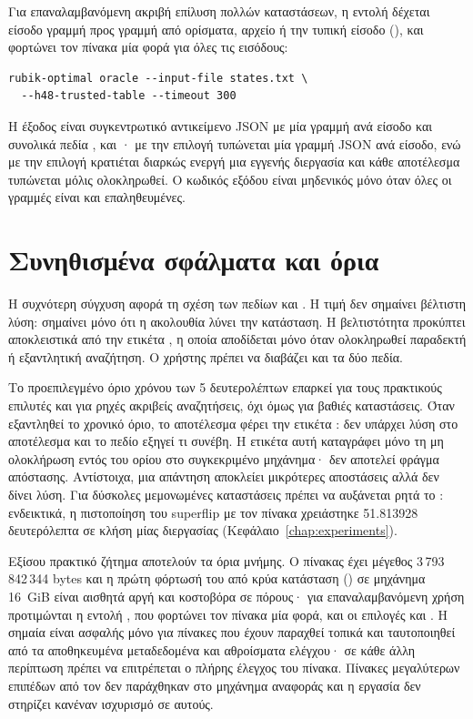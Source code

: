 Για επαναλαμβανόμενη ακριβή επίλυση πολλών καταστάσεων, η εντολή  δέχεται είσοδο γραμμή προς γραμμή από ορίσματα, αρχείο ή την τυπική είσοδο (), και φορτώνει τον πίνακα  μία φορά για όλες τις εισόδους:

\begin{verbatim}
rubik-optimal oracle --input-file states.txt \
  --h48-trusted-table --timeout 300
\end{verbatim}

Η έξοδος είναι συγκεντρωτικό αντικείμενο JSON με μία γραμμή ανά είσοδο και συνολικά πεδία ,  και · με την επιλογή  τυπώνεται μία γραμμή JSON ανά είσοδο, ενώ με την επιλογή  κρατιέται διαρκώς ενεργή μια εγγενής διεργασία και κάθε αποτέλεσμα τυπώνεται μόλις ολοκληρωθεί. Ο κωδικός εξόδου είναι μηδενικός μόνο όταν όλες οι γραμμές είναι  και επαληθευμένες.

\section{Συνηθισμένα σφάλματα και όρια}
\label{sec:usage-errors}

Η συχνότερη σύγχυση αφορά τη σχέση των πεδίων  και . Η τιμή  δεν σημαίνει βέλτιστη λύση: σημαίνει μόνο ότι η ακολουθία λύνει την κατάσταση. Η βελτιστότητα προκύπτει αποκλειστικά από την ετικέτα , η οποία αποδίδεται μόνο όταν ολοκληρωθεί παραδεκτή ή εξαντλητική αναζήτηση. Ο χρήστης πρέπει να διαβάζει και τα δύο πεδία.

Το προεπιλεγμένο όριο χρόνου των 5 δευτερολέπτων επαρκεί για τους πρακτικούς επιλυτές και για ρηχές ακριβείς αναζητήσεις, όχι όμως για βαθιές καταστάσεις. Όταν εξαντληθεί το χρονικό όριο, το αποτέλεσμα φέρει την ετικέτα : δεν υπάρχει λύση στο αποτέλεσμα και το πεδίο  εξηγεί τι συνέβη. Η ετικέτα αυτή καταγράφει μόνο τη μη ολοκλήρωση εντός του ορίου στο συγκεκριμένο μηχάνημα· δεν αποτελεί φράγμα απόστασης. Αντίστοιχα, μια απάντηση  αποκλείει μικρότερες αποστάσεις αλλά δεν δίνει λύση. Για δύσκολες μεμονωμένες καταστάσεις πρέπει να αυξάνεται ρητά το : ενδεικτικά, η πιστοποίηση του superflip με τον πίνακα  χρειάστηκε 51.813928 δευτερόλεπτα σε κλήση μίας διεργασίας (Κεφάλαιο~\ref{chap:experiments}).

Εξίσου πρακτικό ζήτημα αποτελούν τα όρια μνήμης. Ο πίνακας  έχει μέγεθος 3\,793\,842\,344 bytes και η πρώτη φόρτωσή του από κρύα κατάσταση () σε μηχάνημα 16~GiB είναι αισθητά αργή και κοστοβόρα σε πόρους· για επαναλαμβανόμενη χρήση προτιμώνται η εντολή , που φορτώνει τον πίνακα μία φορά, και οι επιλογές  και . Η σημαία  είναι ασφαλής μόνο για πίνακες που έχουν παραχθεί τοπικά και ταυτοποιηθεί από τα αποθηκευμένα μεταδεδομένα και αθροίσματα ελέγχου· σε κάθε άλλη περίπτωση πρέπει να επιτρέπεται ο πλήρης έλεγχος του πίνακα. Πίνακες μεγαλύτερων επιπέδων από τον  δεν παράχθηκαν στο μηχάνημα αναφοράς και η εργασία δεν στηρίζει κανέναν ισχυρισμό σε αυτούς.

